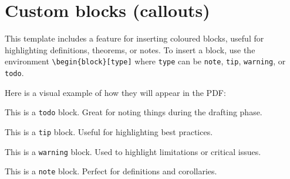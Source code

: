 {	\section{Custom blocks (callouts)}
	This template includes a feature for inserting coloured blocks, useful for highlighting definitions, theorems, or notes. To insert a block, use the environment \texttt{\textbackslash begin\{block\}[type]} where \texttt{type} can be \texttt{note}, \texttt{tip}, \texttt{warning}, or \texttt{todo}.
	
	Here is a visual example of how they will appear in the PDF:
	
	\vspace{.875em}
	\begin{tcbraster}[
		raster columns=2,
		raster equal height,
		nobeforeafter,
		raster column skip=1cm
		]
		\begin{block}[todo]
			This is a \texttt{todo} block. Great for noting things during the drafting phase.
		\end{block}
		\begin{block}[tip]
			This is a \texttt{tip} block. Useful for highlighting best practices.
		\end{block}
	\end{tcbraster}
	
	\begin{tcbraster}[
		raster columns=2,
		raster equal height,
		nobeforeafter,
		raster column skip=1cm
		]
		\begin{block}[warning]
			This is a \texttt{warning} block. Used to highlight limitations or critical issues.
		\end{block}
		\begin{block}[note]
			This is a \texttt{note} block. Perfect for definitions and corollaries.
			\end{block}
			\end{tcbraster}
			\vspace{.875em}
		}
		
		\MediaOptionLogicBlank